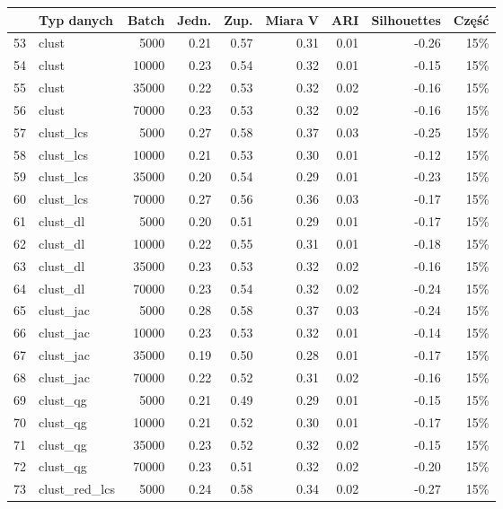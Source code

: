 \documentclass{praca1}
\begin{document}
\begin{table}[!h]
\centering
\begin{tabular}{|rlr|rrr|rr|r|}
\hline
  & Typ danych & Batch & Jedn. & Zup. & Miara V & ARI & Silhouettes & Część \\ 
  \hline
53 & clust & 5000 & 0.21 & 0.57 & 0.31 & 0.01 & -0.26 & 15\% \\ 
  54 & clust & 10000 & 0.23 & 0.54 & 0.32 & 0.01 & -0.15 & 15\% \\ 
  55 & clust & 35000 & 0.22 & 0.53 & 0.32 & 0.02 & -0.16 & 15\% \\ 
  56 & clust & 70000 & 0.23 & 0.53 & 0.32 & 0.02 & -0.16 & 15\% \\ 
   \hline
57 & clust\_lcs & 5000 & 0.27 & 0.58 & 0.37 & 0.03 & -0.25 & 15\% \\ 
  58 & clust\_lcs & 10000 & 0.21 & 0.53 & 0.30 & 0.01 & -0.12 & 15\% \\ 
  59 & clust\_lcs & 35000 & 0.20 & 0.54 & 0.29 & 0.01 & -0.23 & 15\% \\ 
  60 & clust\_lcs & 70000 & 0.27 & 0.56 & 0.36 & 0.03 & -0.17 & 15\% \\ 
   \hline
61 & clust\_dl & 5000 & 0.20 & 0.51 & 0.29 & 0.01 & -0.17 & 15\% \\ 
  62 & clust\_dl & 10000 & 0.22 & 0.55 & 0.31 & 0.01 & -0.18 & 15\% \\ 
  63 & clust\_dl & 35000 & 0.23 & 0.53 & 0.32 & 0.02 & -0.16 & 15\% \\ 
  64 & clust\_dl & 70000 & 0.23 & 0.54 & 0.32 & 0.02 & -0.24 & 15\% \\ 
   \hline
65 & clust\_jac & 5000 & 0.28 & 0.58 & 0.37 & 0.03 & -0.24 & 15\% \\ 
  66 & clust\_jac & 10000 & 0.23 & 0.53 & 0.32 & 0.01 & -0.14 & 15\% \\ 
  67 & clust\_jac & 35000 & 0.19 & 0.50 & 0.28 & 0.01 & -0.17 & 15\% \\ 
  68 & clust\_jac & 70000 & 0.22 & 0.52 & 0.31 & 0.02 & -0.16 & 15\% \\ 
   \hline
69 & clust\_qg & 5000 & 0.21 & 0.49 & 0.29 & 0.01 & -0.15 & 15\% \\ 
  70 & clust\_qg & 10000 & 0.21 & 0.52 & 0.30 & 0.01 & -0.17 & 15\% \\ 
  71 & clust\_qg & 35000 & 0.23 & 0.52 & 0.32 & 0.02 & -0.15 & 15\% \\ 
  72 & clust\_qg & 70000 & 0.23 & 0.51 & 0.32 & 0.02 & -0.20 & 15\% \\ 
   \hline
73 & clust\_red\_lcs & 5000 & 0.24 & 0.58 & 0.34 & 0.02 & -0.27 & 15\% \\ 

\end{tabular}
\end{table}
\end{document}
